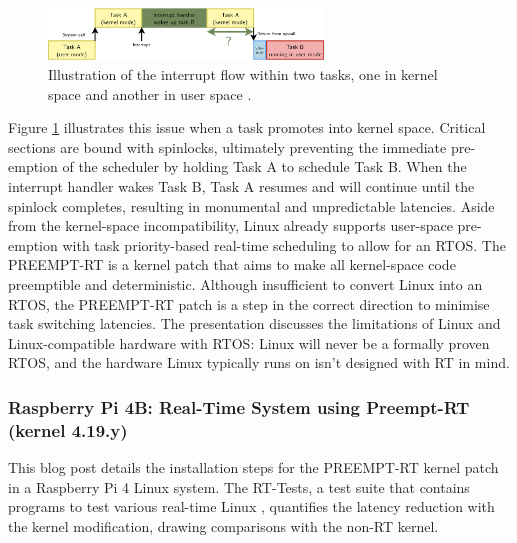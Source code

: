 \begin{figure}[h]
    \centering
    \includegraphics[width=0.65\textwidth]{assets/bootlin-interrupt-flow.png}
    \caption{Illustration of the interrupt flow within two tasks, one in kernel space and another in user space \cite{bootlinUnderstandingLinuxRealtime2024}.}
    \label{fig:bootlin_flow}
\end{figure}

Figure \ref{fig:bootlin_flow} illustrates this issue when a task promotes into kernel space. Critical sections are bound with spinlocks, ultimately preventing the immediate pre-emption of the scheduler by holding Task A to schedule Task B. When the interrupt handler wakes Task B, Task A resumes and will continue until the spinlock completes, resulting in monumental and unpredictable latencies. Aside from the kernel-space incompatibility, Linux already supports user-space pre-emption with task priority-based real-time scheduling to allow for an RTOS. The PREEMPT-RT is a kernel patch that aims to make all kernel-space code preemptible and deterministic. Although insufficient to convert Linux into an RTOS, the PREEMPT-RT patch is a step in the correct direction to minimise task switching latencies. The presentation discusses the limitations of Linux and Linux-compatible hardware with RTOS: Linux will never be a formally proven RTOS, and the hardware Linux typically runs on isn't designed with RT in mind.

\subsubsection{Raspberry Pi 4B: Real-Time System using Preempt-RT (kernel 4.19.y) \cite{maurorivaRaspberryPi4B2019}}
This blog post details the installation steps for the PREEMPT-RT kernel patch in a Raspberry Pi 4 Linux system. The RT-Tests, a test suite that contains programs to test various real-time Linux \cite{costashulRTTests2023}, quantifies the latency reduction with the kernel modification, drawing comparisons with the non-RT kernel.

